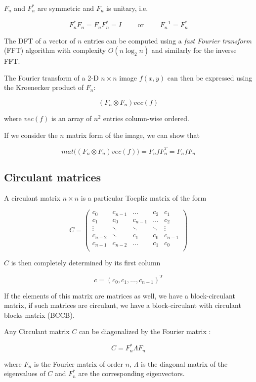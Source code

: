 $F_n$ and $F_n^*$ are symmetric and $F_n$ is unitary, i.e.

$$F_n^* F_n = F_n F_n^* = I \qquad \mbox{ or } \qquad F_n^{-1} = F_n^*$$

The DFT of a vector of $n$ entries can be computed using a \emph{fast Fourier transform} (FFT) algorithm with complexity $O(n \log_2 n)$ and similarly for the inverse FFT.

The Fourier transform of a 2-D $n \times n$ image $f(x,y)$ can then be expressed using the Kroenecker product of $F_n$:

$$(F_n \otimes F_n) vec(f)$$

where $vec(f)$ is an array of $n^2$ entries column-wise ordered.

If we consider the $n$ matrix form of the image, we can show that

$$mat \biggl( \left(F_n \otimes F_n\right) vec(f)\biggr) = F_n f F_n^T = F_n f F_n$$

\subsection{Circulant matrices} \label{app:circ}

A circulant matrix  $n\times n$ is a particular Toepliz matrix of the form

$$C = \begin{pmatrix}
c_0 & c_{n-1} & \dots & c_2 & c_1 \\
c_1 & c_0 & c_{n-1} & \dots & c_2 \\
\vdots & \ddots & \ddots & \ddots & \vdots \\
c_{n-2} & \ddots & c_1 & c_0 & c_{n-1} \\
c_{n-1} & c_{n-2} & \dots & c_1 & c_0 \\
\end{pmatrix}
$$

$C$ is then completely determined by its first column

$$c=(c_0,c_1,\dots, c_{n-1})^T$$

If the elements of this matrix are matrices as well, we have a block-circulant matrix, if such matrices are circulant, we have a block-circulant with circulant blocks matrix (BCCB).

Any Circulant matrix $C$ can be diagonalized by the Fourier matrix \citep{circulant}:

$$C = F_n^* \Lambda F_n $$

where $F_n$ is the Fourier matrix of order $n$, $\Lambda$ is the diagonal matrix of the eigenvalues of $C$ and $F_n^*$ are the corresponding eigenvectors.

